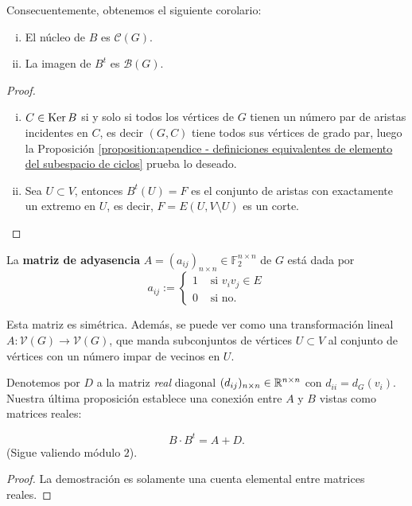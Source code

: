 \documentclass[../main.tex]{subfiles}
\begin{document}
Consecuentemente, obtenemos el siguiente corolario:

\begin{corollary}
\begin{enumerate}[(i)]
\item El núcleo de $B$ es $\mathcal C(G)$.
\item La imagen de $B^t$ es $\mathcal B (G)$.
\end{enumerate}
\end{corollary}
\begin{proof}
\begin{enumerate}[(i)]
\item $C \in \operatorname{Ker} B$ si y solo si todos los vértices de $G$ tienen un número par de aristas incidentes en $C$, es
decir $(G,C)$ tiene todos sus vértices de grado par, luego la Proposición \ref{proposition:apendice - definiciones equivalentes de elemento del subespacio de ciclos} prueba lo deseado.
\item Sea $U \subset V$, entonces $B^t (U) = F$ es el conjunto de aristas con exactamente un extremo en $U$, es decir, $F = E(U, V \setminus U)$ es un corte.
\end{enumerate}
\end{proof}


\begin{definition}
La \textbf{matriz de adyasencia} $A = (a_{ij})_{n \times n} \in \mathbb{F}_2^{n \times n}$ de $G$ está dada por
\[
    a_{ij} := \begin{cases}
            1 & \text{ si $v_{i} v_j \in E$}\\
            0 & \text{ si no.}
                \end{cases}
\]
\end{definition}

\begin{obs}
Esta matriz es simétrica. Además, se puede ver como una transformación lineal $A : \mathcal V (G) \rightarrow \mathcal V (G)$, que manda subconjuntos de vértices $U \subset V$ al conjunto de vértices con un número impar de vecinos en $U$.
\end{obs}

Denotemos por $D$ a la matriz \textit{real} diagonal $(d_{ij})_{n \times n} \in \mathbb{R}^{n \times n}$ con $d_{ii} = d_G(v_i)$. Nuestra última proposición establece una conexión entre $A$ y $B$ vistas como matrices reales:

\begin{proposition}
$$
B \cdot B^t = A + D.
$$
(Sigue valiendo módulo $2$).
\end{proposition}
\begin{proof}
La demostración es solamente una cuenta elemental entre matrices reales.
\end{proof}
\end{document}
